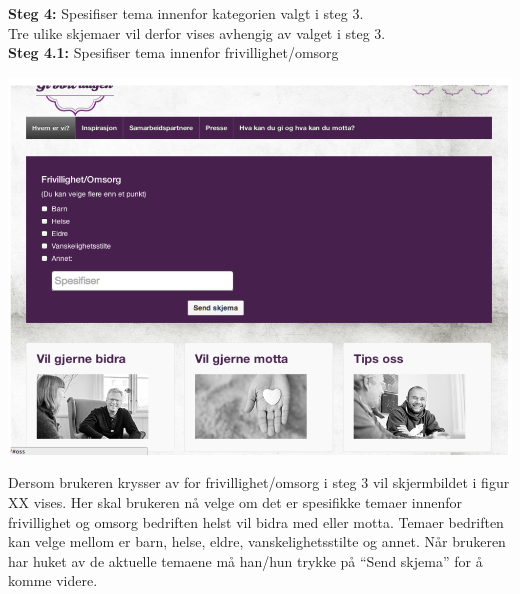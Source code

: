 {\bf Steg 4:} Spesifiser tema innenfor kategorien valgt i steg 3.\\
Tre ulike skjemaer vil derfor vises avhengig av valget i steg 3.\\

{\bf Steg 4.1:} Spesifiser tema innenfor frivillighet/omsorg
\begin{center}
\includegraphics[clip=true, width=1 \textwidth,
trim=0cm 0cm 0cm 0cm]{spesifisertema.png}
\label{fig:spesifisertema}
\end{center}

Dersom brukeren krysser av for frivillighet/omsorg i steg 3 vil skjermbildet i figur XX vises. Her skal brukeren nå velge om det er spesifikke temaer innenfor frivillighet og omsorg bedriften helst vil bidra med eller motta. Temaer bedriften kan velge mellom er barn, helse, eldre, vanskelighetsstilte og annet. Når brukeren har huket av de aktuelle temaene må han/hun trykke på “Send skjema” for å komme videre.\\

